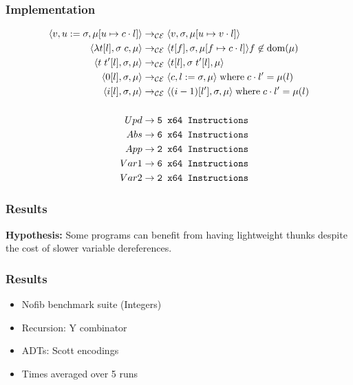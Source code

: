 \documentclass[17pt]{beamer}
\begin{document}
\begin{frame}
\frametitle{Implementation}
\footnotesize
\begin{align*}
\langle v, u := \sigma, \mu[u \mapsto c \cdot l] \rangle 
  &\rightarrow_{\mathcal{CE}}
\langle v, \sigma, \mu[u \mapsto v \cdot l] \rangle  \\
\langle \lambda t[l], \sigma \; c, \mu \rangle 
  &\rightarrow_{\mathcal{CE}}
\langle t[f], \sigma, \mu[f \mapsto c \cdot l]\rangle f \not \in \textnormal{dom}(\mu)  \\
\langle t \; t'[l], \sigma, \mu \rangle
  &\rightarrow_{\mathcal{CE}}
\langle t[l], \sigma \; t'[l], \mu \rangle \\
\langle 0[l], \sigma, \mu \rangle
  &\rightarrow_{\mathcal{CE}}
\langle c, l := \sigma, \mu \rangle 
\; \textnormal{where} \; c \cdot l' = \mu(l)\\
\langle i[l], \sigma, \mu \rangle
  &\rightarrow_{\mathcal{CE}}
\langle (i-1)[l'], \sigma, \mu \rangle
\; \textnormal{where} \; c \cdot l' = \mu(l) \\ \\
Upd &\rightarrow \texttt{5 x64 Instructions} \\
Abs &\rightarrow \texttt{6 x64 Instructions} \\
App &\rightarrow \texttt{2 x64 Instructions} \\
Var1 &\rightarrow \texttt{6 x64 Instructions} \\
Var2 &\rightarrow \texttt{2 x64 Instructions} 
\end{align*}
\end{frame}

\begin{frame}[fragile]
\frametitle{Results}
\centering
\textbf{Hypothesis:} Some programs can benefit from having lightweight thunks
despite the cost of slower variable dereferences.
\end{frame}

\begin{frame}
\frametitle{Results}
\begin{itemize}
\item Nofib benchmark suite (Integers)
\item Recursion: Y combinator
\item ADTs: Scott encodings
\item Times averaged over 5 runs
\end{itemize}
\end{frame}

\end{document}
